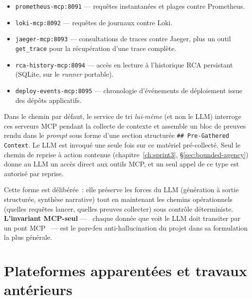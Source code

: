 \documentclass[11pt,a4paper,oneside]{report}
\begin{document}
\begin{itemize}
  \item \texttt{prometheus-mcp:8091} --- requêtes instantanées et
        plages contre Prometheus.
  \item \texttt{loki-mcp:8092} --- requêtes de journaux contre Loki.
  \item \texttt{jaeger-mcp:8093} --- consultations de traces contre
        Jaeger, plus un outil \texttt{get\_trace} pour la
        récupération d'une trace complète.
  \item \texttt{rca-history-mcp:8094} --- accès en lecture à
        l'historique RCA persistant (SQLite, sur le \emph{runner}
        portable).
  \item \texttt{deploy-events-mcp:8095} --- chronologie d'événements
        de déploiement issue des dépôts applicatifs.
\end{itemize}

Dans le chemin par défaut, le service de tri \emph{lui-même} (et non
le LLM) interroge ces serveurs MCP pendant la collecte de contexte
et assemble un bloc de preuves rendu dans le \emph{prompt} sous
forme d'une section structurée \texttt{\#\# Pre-Gathered Context}.
Le LLM est invoqué une seule fois sur ce matériel pré-collecté. Seul
le chemin de reprise à action contenue (chapitre~\ref{ch:sprint3},
\S\ref{sec:bounded-agency}) donne au LLM un accès direct aux outils
MCP, et un seul appel de ce type est autorisé par reprise.

Cette forme est délibérée~: elle préserve les forces du LLM
(génération à sortie structurée, synthèse narrative) tout en
maintenant les chemins opérationnels (quelles requêtes lancer,
quelles preuves collecter) sous contrôle déterministe.
\textbf{L'invariant MCP-seul} --- \og~chaque donnée que voit le LLM
doit transiter par un pont MCP~\fg{} --- est le pare-feu
anti-hallucination du projet dans sa formulation la plus générale.

\section{Plateformes apparentées et travaux antérieurs}
\end{document}
